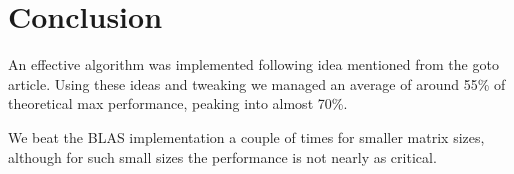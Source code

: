 \documentclass[a4paper.11pt,oneside]{book}
\begin{document}
\chapter{Conclusion}

An effective algorithm was implemented following idea mentioned from the goto
article. Using these ideas and tweaking we managed an average of around 55\% of
theoretical max performance, peaking into almost 70\%.

We beat the BLAS implementation a couple of times for smaller matrix sizes,
although for such small sizes the performance is not nearly as critical.


\end{document}
